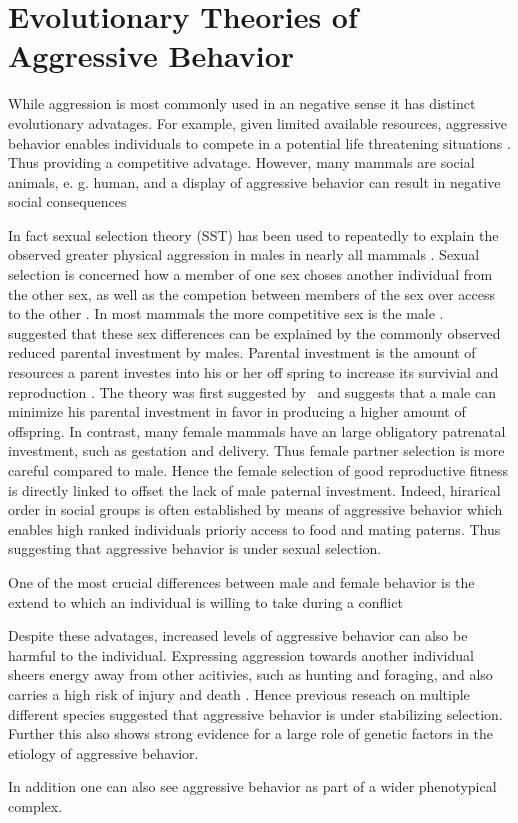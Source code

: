 \section{Evolutionary Theories of Aggressive Behavior}
\label{sec:evolutionary_theories_on_aggressive_behavior}

While aggression is most commonly used in an negative sense it has distinct evolutionary advatages.
For example, given limited available resources, aggressive behavior enables individuals to compete in a potential life threatening situations \cite{Anholt2012}.
Thus providing a competitive advatage.
However, many mammals are social animals, e. g. human, and a display of aggressive behavior can result in negative social consequences %

In fact sexual selection theory (SST) has been used to repeatedly to explain the observed greater physical aggression in males in nearly all mammals	 \cite{Archer2004,Anderson2002}. 
Sexual selection is concerned how a member of one sex choses another individual from the other sex, as well as the competion between members of the sex over access to the other \cite{Darwin1859}.
In most mammals the more competitive sex is the male \cite{Archer2009}. 
~\cite{Trivers1972} suggested that these sex differences can be explained by the commonly observed reduced parental investment by males.
Parental investment is the amount of resources a parent investes into his or her off spring to increase its survivial and reproduction \cite{Archer2009}.
The theory was first suggested by~\cite{0198504403} and suggests that a male can minimize his parental investment in favor in producing a higher amount of offspring.
In contrast, many female mammals have an large obligatory patrenatal investment, such as gestation and delivery.
Thus female partner selection is more careful compared to male.
Hence the female selection of good reproductive fitness is directly linked to offset the lack of male paternal investment.
Indeed, hirarical order in social groups is often established by means of aggressive behavior which enables high ranked individuals prioriy access to food and mating paterns\cite{Lindenfors2011}. 
Thus suggesting that aggressive behavior is under sexual selection.


One of the most crucial differences between male and female behavior is the extend to which an individual is willing to take during a conflict %



Despite these advatages, increased levels of aggressive behavior can also be harmful to the individual.
Expressing aggression towards another individual sheers energy away from other acitivies, such as hunting and foraging, and also carries a high risk of injury and death \cite{Packer1995}.  
Hence previous reseach on multiple different species suggested that aggressive behavior is under stabilizing selection.
Further this also shows strong evidence for a large role of genetic factors in the etiology of aggressive behavior. 


In addition one can also see aggressive behavior as part of a wider phenotypical complex. 

\begin{figure}
	\scalebox{0.8}{
	
}
\end{figure}

